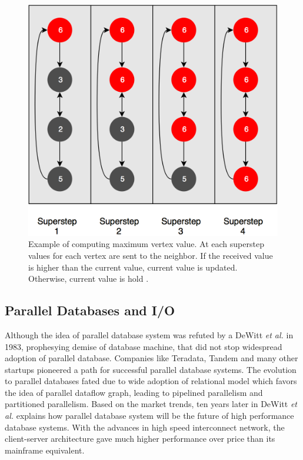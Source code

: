 \documentclass[runningheads,a4paper]{llncs}
\begin{document}
{\begin{figure}[!ht]
	\includegraphics[scale=0.23]{./images/graph_superstep.png}
	\centering
	\caption{Example of computing maximum vertex value. At each superstep values for each vertex are sent to the neighbor. If the received value is higher than the current value, current value is updated. Otherwise, current value is hold \cite{sakr2013processing}.}
	\label{fig:max_super}
\end{figure}

\subsection{Parallel Databases and I/O}
Although the idea of parallel database system was refuted by a  \cite{dewitt1983database} DeWitt \textit{et al.} in 1983, prophesying demise of database machine, that did not stop widespread adoption of parallel database. Companies like Teradata, Tandem and many other startups pioneered a path for successful parallel database systems. The evolution to parallel databases fated due to wide adoption of relational model which favors the idea of parallel dataflow graph, leading to pipelined parallelism and partitioned parallelism. Based on the market trends, ten years later in \cite{dewitt1992parallel} DeWitt \textit{et al.} explains how parallel database system will be the future of high performance database systems. With the advances in high speed interconnect network, the client-server architecture gave much higher performance over price than its mainframe equivalent.\\

}
\end{document}
